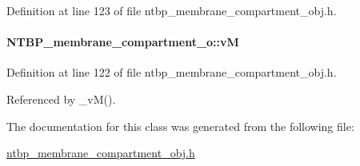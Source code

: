 Definition at line 123 of file ntbp\_\-membrane\_\-compartment\_\-obj.h.

\paragraph[{vM}]{ {\bf NTBP\_\-membrane\_\-compartment\_\-o::vM}}\hfill\label{class_n_t_b_p__membrane__compartment__o_a9c3d7fb4b4f999e2bdc6894524cbc746}


Definition at line 122 of file ntbp\_\-membrane\_\-compartment\_\-obj.h.



Referenced by \_\-vM().



The documentation for this class was generated from the following file:\begin{DoxyCompactItemize}
\item 
\hyperlink{ntbp__membrane__compartment__obj_8h}{ntbp\_\-membrane\_\-compartment\_\-obj.h}\end{DoxyCompactItemize}
